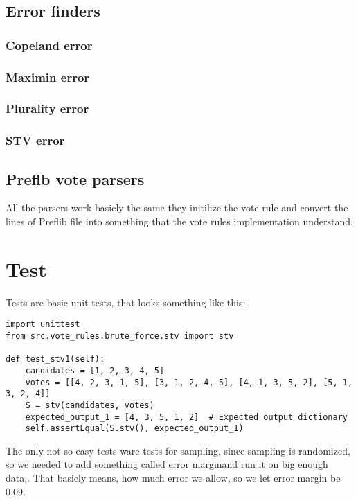 \documentclass[a4paper,12pt]{report}
\begin{document}
	\section{Error finders}
	
	\subsection{Copeland error}
	
	\subsection{Maximin error}
	
	\subsection{Plurality error}
	
	\subsection{STV error}
	
	\section{Preflb vote parsers}
	
	All the parsers work basicly the same they initilize the vote rule and convert the lines of Preflib file into something that the vote rules implementation understand.
	
	\chapter{Test}
	
	Tests are basic unit tests, that looks something like this:
	
	\begin{lstlisting}
import unittest
from src.vote_rules.brute_force.stv import stv

def test_stv1(self):
	candidates = [1, 2, 3, 4, 5]
	votes = [[4, 2, 3, 1, 5], [3, 1, 2, 4, 5], [4, 1, 3, 5, 2], [5, 1, 3, 2, 4]]
	S = stv(candidates, votes)
	expected_output_1 = [4, 3, 5, 1, 2]  # Expected output dictionary
	self.assertEqual(S.stv(), expected_output_1)
	\end{lstlisting}
	
	The only not so easy tests ware tests for sampling, since sampling is randomized, so we needed to add something called error marginand run it on big enough data,. That basicly means, how much error we allow, so we let error margin be $0.09$.
	
	
\end{document}
